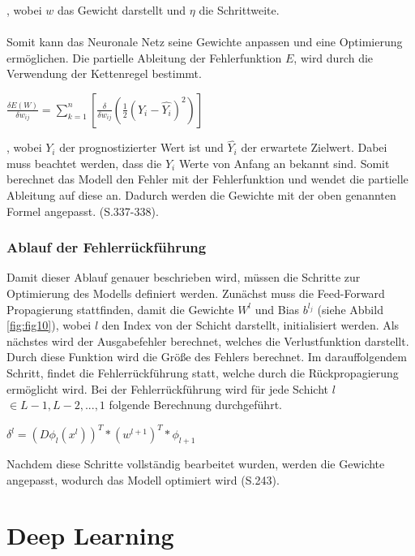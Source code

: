 \documentclass[12pt]{scrreprt}
\begin{document}
, wobei $w$ das Gewicht darstellt und $\eta$ die Schrittweite.\\
\\
Somit kann das Neuronale Netz seine Gewichte anpassen und eine Optimierung ermöglichen. Die partielle Ableitung der Fehlerfunktion $E$, wird durch die Verwendung der Kettenregel bestimmt.

\begin{center}
	$\frac{\delta E(W)}{\delta w_{ij}} =\sum_{k=1}^{n}[\frac{\delta}{\delta w_{ij}}(\frac{1}{2}(Y_{i} - \hat{Y_{i}})^{2})]$
\end{center}

, wobei $Y_{i}$ der prognostizierter Wert ist und $\hat{Y_{i}}$ der erwartete Zielwert. Dabei muss beachtet werden, dass die $Y_{i}$ Werte von Anfang an bekannt sind. Somit berechnet das Modell den Fehler mit der Fehlerfunktion und wendet die partielle Ableitung auf diese an. Dadurch werden die Gewichte mit der oben genannten Formel angepasst. \cite{Vogl2021} (S.337-338). 

\subsubsection{Ablauf der Fehlerrückführung}

Damit dieser Ablauf genauer beschrieben wird, müssen die Schritte zur Optimierung des Modells definiert werden. Zunächst muss die Feed-Forward Propagierung stattfinden, damit die Gewichte $W^{l}$ und Bias $b^{l_{j}}$ (siehe Abbild \ref{fig:fig10}), wobei $l$ den Index von der Schicht darstellt, initialisiert werden. Als nächstes wird der Ausgabefehler berechnet, welches die Verlustfunktion darstellt. Durch diese Funktion wird die Größe des Fehlers berechnet. Im darauffolgendem Schritt, findet die Fehlerrückführung statt, welche durch die Rückpropagierung ermöglicht wird. Bei der Fehlerrückführung wird für jede Schicht $l$ $\in{L-1, L-2, ..., 1}$ folgende Berechnung durchgeführt.

\begin{center}
	$\delta^{l} = (D\phi_{l}(x^{l}))^{T} * (w^{l+1})^{T} * \phi_{l+1}$
\end{center}


Nachdem diese Schritte vollständig bearbeitet wurden, werden die Gewichte angepasst, wodurch das Modell optimiert wird \cite{Plaue2021} (S.243).

\section{Deep Learning}
\end{document}
